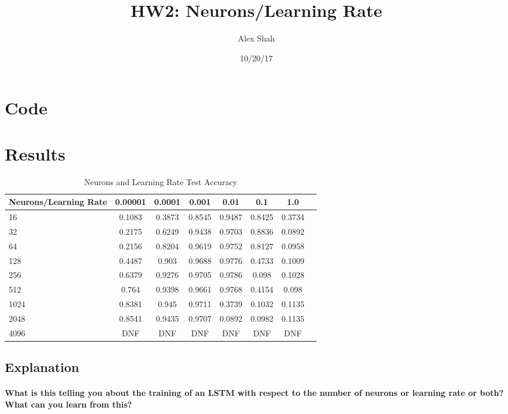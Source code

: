 \documentclass[10pt,a4paper]{report}
\title{HW2: Neurons/Learning Rate}
\author{Alex Shah}
\date{10/20/17}
\begin{document}
\lstset{language=Python}
\maketitle

\section{Code}



\clearpage

\section{Results}

\begin{table}[h]
 \caption{Neurons and Learning Rate Test Accuracy}
 \label{tbl:aTable}
 \begin{center}
  \begin{tabular}{lccccccr}
    \hline 
    Neurons/Learning Rate & 0.00001 & 0.0001 & 0.001 & 0.01 & 0.1 & 1.0  \\
    \hline
    16 & 0.1083 & 0.3873 & 0.8545 & 0.9487 & 0.8425 & 0.3734 \\
    32 & 0.2175 & 0.6249 & 0.9438 & 0.9703 & 0.8836 & 0.0892 \\
    64 & 0.2156 & 0.8204 & 0.9619 & 0.9752 & 0.8127 & 0.0958 \\
    128 & 0.4487 & 0.903 & 0.9688 & 0.9776 & 0.4733 & 0.1009 \\
    256 & 0.6379 & 0.9276 & 0.9705 & 0.9786 & 0.098 & 0.1028 \\
    512 & 0.764 & 0.9398 & 0.9661 & 0.9768 & 0.4154 & 0.098 \\
    1024 & 0.8381 & 0.945 & 0.9711 & 0.3739 & 0.1032 & 0.1135 \\
    2048 & 0.8541 & 0.9435 & 0.9707 & 0.0892 & 0.0982 & 0.1135 \\
    4096 & DNF & DNF & DNF & DNF & DNF & DNF \\
    \hline 
  \end{tabular}
 \end{center}
\end{table}

\subsection{Explanation}

\paragraph{
What is this telling you about the training of an LSTM with respect to the number of neurons or learning rate or both? What can you learn from this?
}
\end{document}
